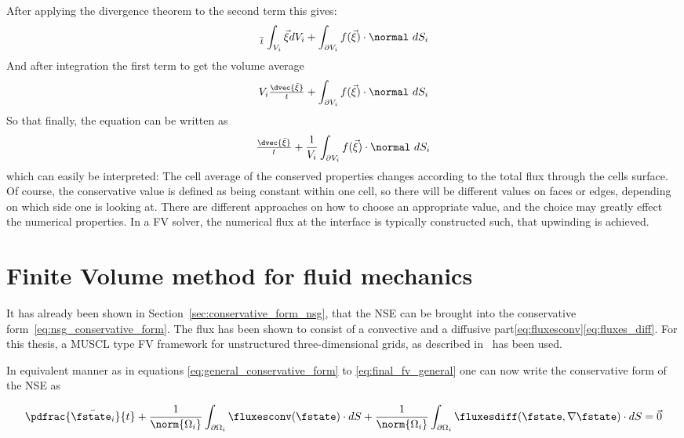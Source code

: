\documentclass[../main.tex]{subfiles}
\begin{document}
After applying the divergence theorem to the second term this gives:
\begin{align}
\tfrac{~}{t}\int_{V_i} \vec{\xi} dV_i + \int_{\partial V_i} f(\vec{\xi})\cdot\normal~dS_i
\end{align}
And after integration the first term to get the volume average
\begin{align}
V_i \tfrac{\dvec{\bar{\xi}}}{t} + \int_{\partial V_i} f(\vec{\xi})\cdot\normal~dS_i
\end{align}
So that finally, the equation can be written as
\begin{align}\label{eq:final_fv_general}
\tfrac{\dvec{\bar{\xi}}}{t} + \frac{1}{V_i} \int_{\partial V_i} f(\vec{\xi})\cdot\normal~dS_i
\end{align}
which can easily be interpreted: The cell average of the conserved properties changes according to the total flux through the cells surface.
Of course, the conservative value is defined as being constant within one cell, so there will be different values on faces or edges, depending on which side one is looking at. There are different approaches on how to choose an appropriate value, and the choice may greatly effect the numerical properties. In a \ac{FV} solver, the numerical flux at the interface is typically constructed such, that upwinding is achieved.

\section{Finite Volume method for fluid mechanics}\label{sec:fv_fluid_mechanics}
It has already been shown in Section~\ref{sec:conservative_form_nsg}, that the \ac{NSE} can be brought into the conservative form~\eqref{eq:nsg_conservative_form}. The flux has been shown to consist of a convective and a diffusive part\eqref{eq:fluxesconv}\eqref{eq:fluxes_diff}.
For this thesis, a \ac{MUSCL} type \ac{FV} framework for unstructured three-dimensional grids, as described in~\cite{Main2014} has been used.



In equivalent manner as in equations \eqref{eq:general_conservative_form} to \eqref{eq:final_fv_general} one can now write the conservative form of the \ac{NSE} as

\begin{align}\label{eq:NSE_full_FV formulation}
\pdfrac{\bar{\fstate_i}}{t} +
\frac{1}{\norm{\Omega_i}} \int_{\partial\Omega_i} \fluxesconv(\fstate)\cdot dS +
\frac{1}{\norm{\Omega_i}} \int_{\partial\Omega_i} \fluxesdiff(\fstate,\nabla \fstate)\cdot dS =
\vec{0}
\end{align}
\end{document}
